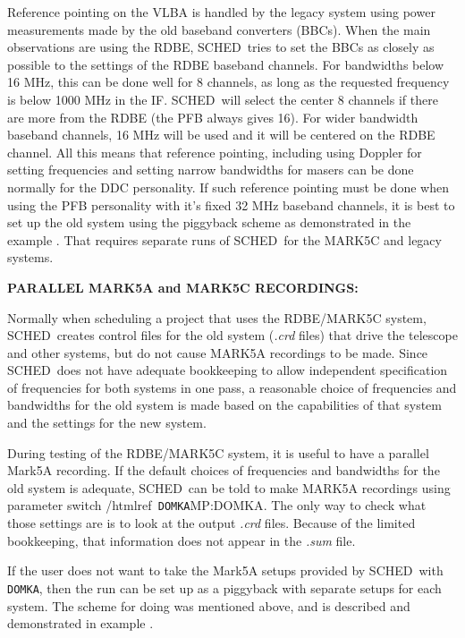 \documentclass{report}
\newcommand{\schedb}{{\sc SCHED~}}
\begin{document}
Reference pointing on the VLBA is handled by the legacy system using
power measurements made by the old baseband converters (BBCs).  When
the main observations are using the RDBE, \schedb tries to set the
BBCs as closely as possible to the settings of the RDBE baseband
channels.  For bandwidths below 16 MHz, this can be done well for 8
channels, as long as the requested frequency is below 1000 MHz in the
IF.  \schedb will select the center 8 channels if there are more from
the RDBE (the PFB always gives 16).  For wider bandwidth baseband
channels, 16 MHz will be used and it will be centered on the RDBE
channel.  All this means that reference pointing, including using
Doppler for setting frequencies and setting narrow bandwidths for
masers can be done normally for the DDC personality.  If such
reference pointing must be done when using the PFB personality with
it's fixed 32 MHz baseband channels, it is best to set up the old
system using the piggyback scheme as demonstrated in the example
.  That
requires separate runs of \schedb for the MARK5C and legacy systems.


{\bf PARALLEL MARK5A and MARK5C RECORDINGS:}

Normally when scheduling a project that uses the RDBE/MARK5C system,
\schedb creates control files for the old system ({\sl .crd} files)
that drive the telescope and other systems, but do not cause MARK5A
recordings to be made.  Since \schedb does not have adequate bookkeeping
to allow independent specification of frequencies for both systems
in one pass, a reasonable choice of frequencies and bandwidths for 
the old system is made based on the capabilities of that system and
the settings for the new system.  

During testing of the RDBE/MARK5C system, it is useful to have a
parallel Mark5A recording.  If the default choices of frequencies and
bandwidths for the old system is adequate, \schedb can be told to make
MARK5A recordings using parameter switch /htmlref{{\tt
DOMKA}}{MP:DOMKA}.  The only way to check what those settings are is
to look at the output {\sl .crd} files.  Because of the limited 
bookkeeping, that information does not appear in the {\sl .sum} file.

If the user does not want to take the Mark5A setups provided by
\schedb with {\tt DOMKA}, then the run can be set up as a piggyback
with separate setups for each system.  The scheme for doing was 
mentioned above, and is described and demonstrated in example
.
\end{document}

